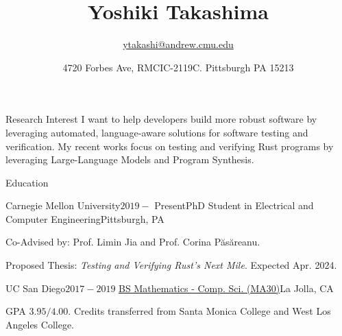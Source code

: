 \documentclass{resume} %
\title{\bf Yoshiki Takashima}
\author{\href{ytakashi@andrew.cmu.edu}{ytakashi@andrew.cmu.edu}}
\date{4720 Forbes Ave, RMCIC-2119C. Pittsburgh PA 15213}
\begin{document}
\maketitle

\begin{rSection}{Research Interest}
  I want to help developers build more robust software by
  leveraging automated, language-aware solutions for software testing and
  verification. My recent works focus on testing and verifying Rust
  programs by leveraging Large-Language Models and Program Synthesis.
\end{rSection}

\begin{rSection}{Education}
  \begin{rSubsection}{Carnegie Mellon University}{$2019 -$
      Present}{PhD Student in Electrical and Computer
      Engineering}{Pittsburgh, PA}
  \item Co-Advised by: Prof. Limin Jia and Prof. Corina P\u{a}s\u{a}reanu.
  \item Proposed Thesis: \textit{Testing and Verifying Rust's Next Mile}. Expected Apr. 2024.
  \end{rSubsection}

  \begin{rSubsection}{UC San Diego}{$2017 -
      2019$}{
      \href{https://catalog.ucsd.edu/curric/MATH-ug.html}
      {BS Mathematics - Comp. Sci. (MA30)}}{La Jolla, CA}
  \item GPA $3.95/4.00$. Credits transferred from Santa Monica College
    and West Los Angeles College.
  \end{rSubsection}


\end{rSection}
\end{document}
